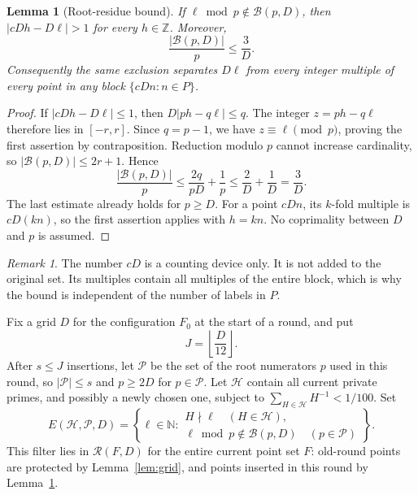 \documentclass[11pt,reqno]{amsart}
\newtheorem{lemma}[theorem]{Lemma}
\theoremstyle{definition}
\theoremstyle{remark}
\newtheorem{remark}[theorem]{Remark}
\numberwithin{equation}{section}
\newcommand{\N}{\mathbb N}
\newcommand{\Z}{\mathbb Z}
\newcommand{\cR}{\mathcal R}
\begin{document}
\begin{lemma}[Root-residue bound]\label{lem:cost}
If $\ell\bmod p\notin\mathcal B(p,D)$, then
$|cDh-D\ell|>1$ for every $h\in\Z$. Moreover,
\begin{equation}\label{eq:cost}
 \frac{|\mathcal B(p,D)|}{p}\leq\frac3D.
\end{equation}
Consequently the same exclusion separates $D\ell$ from every integer
multiple of every point in any block $\{cDn:n\in P\}$.
\end{lemma}

\begin{proof}
If $|cDh-D\ell|\leq1$, then $D|ph-q\ell|\leq q$.
The integer $z=ph-q\ell$ therefore lies in $[-r,r]$. Since $q=p-1$,
we have $z\equiv\ell\pmod p$, proving the first assertion by
contraposition. Reduction modulo $p$ cannot increase cardinality, so
$|\mathcal B(p,D)|\leq2r+1$. Hence
\[
 \frac{|\mathcal B(p,D)|}{p}
 \leq\frac{2q}{pD}+\frac1p
 \leq\frac2D+\frac1D=\frac3D.
\]
The last estimate already holds for $p\geq D$. For a point $cDn$,
its $k$-fold multiple is $cD(kn)$, so the first assertion applies with
$h=kn$. No coprimality between $D$ and $p$ is assumed.
\end{proof}

\begin{remark}
The number $cD$ is a counting device only. It is not added to the
original set. Its multiples contain all multiples of the entire block,
which is why the bound is independent of the number of labels in $P$.
\end{remark}

Fix a grid $D$ for the configuration $F_0$ at the start of a round, and
put
\begin{equation}\label{eq:round-length}
 J=\left\lfloor\frac D{12}\right\rfloor.
\end{equation}
After $s\leq J$ insertions, let $\mathcal P$ be the set of the root
numerators $p$ used in this round, so $|\mathcal P|\leq s$ and $p\geq2D$
for $p\in\mathcal P$. Let $\mathcal H$ contain all current private
primes, and possibly a newly chosen one, subject to
$\sum_{H\in\mathcal H}H^{-1}<1/100$. Set
\begin{equation}\label{eq:round-filter}
 E(\mathcal H,\mathcal P,D)=
 \left\{\ell\in\N:
 \begin{array}{l}
 H\nmid\ell\quad(H\in\mathcal H),\\
 \ell\bmod p\notin\mathcal B(p,D)\quad(p\in\mathcal P)
 \end{array}\right\}.
\end{equation}
This filter lies in $\cR(F,D)$ for the entire current point set $F$:
old-round points are protected by Lemma~\ref{lem:grid}, and points
inserted in this round by Lemma~\ref{lem:cost}.
\end{document}
